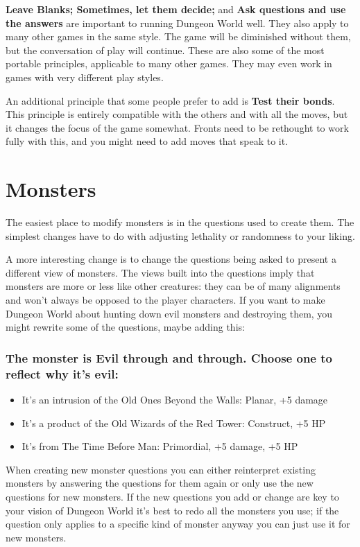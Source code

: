  \textbf{Leave Blanks; Sometimes, let them decide;}
 and \textbf{Ask questions and use the answers}
 are important to running Dungeon World well. They also apply to many other games in the same style. The game will be diminished without them, but the conversation of play will continue. These are also some of the most portable principles, applicable to many other games. They may even work in games with very different play styles.


 An additional principle that some people prefer to add is \textbf{Test their bonds}. This principle is entirely compatible with the others and with all the moves, but it changes the focus of the game somewhat. Fronts need to be rethought to work fully with this, and you might need to add moves that speak to it.
\section*{Monsters}


 The easiest place to modify monsters is in the questions used to create them. The simplest changes have to do with adjusting lethality or randomness to your liking.


 A more interesting change is to change the questions being asked to present a different view of monsters. The views built into the questions imply that monsters are more or less like other creatures: they can be of many alignments and won't always be opposed to the player characters. If you want to make Dungeon World about hunting down evil monsters and destroying them, you might rewrite some of the questions, maybe adding this:
\subsubsection{The monster is Evil through and through. Choose one to reflect why it's evil:}
\begin{itemize}
\item It's an intrusion of the Old Ones Beyond the Walls: Planar, +5 damage
\item It's a product of the Old Wizards of the Red Tower: Construct, +5 HP
\item It's from The Time Before Man: Primordial, +5 damage, +5 HP

\end{itemize}


 When creating new monster questions you can either reinterpret existing monsters by answering the questions for them again or only use the new questions for new monsters. If the new questions you add or change are key to your vision of Dungeon World it's best to redo all the monsters you use; if the question only applies to a specific kind of monster anyway you can just use it for new monsters.


